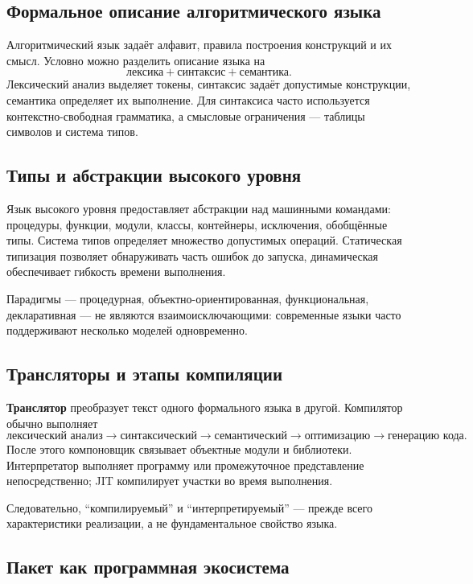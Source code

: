\subsection{Формальное описание алгоритмического языка}

Алгоритмический язык задаёт алфавит, правила построения конструкций и их смысл.
Условно можно разделить описание языка на
\[
\boxed{\text{лексика}+\text{синтаксис}+\text{семантика}}.
\]
Лексический анализ выделяет токены, синтаксис задаёт допустимые конструкции,
семантика определяет их выполнение. Для синтаксиса часто используется
контекстно-свободная грамматика, а смысловые ограничения --- таблицы символов и
система типов.

\subsection{Типы и абстракции высокого уровня}

Язык высокого уровня предоставляет абстракции над машинными командами:
процедуры, функции, модули, классы, контейнеры, исключения, обобщённые типы.
Система типов определяет множество допустимых операций. Статическая типизация
позволяет обнаруживать часть ошибок до запуска, динамическая обеспечивает
гибкость времени выполнения.

Парадигмы --- процедурная, объектно-ориентированная, функциональная,
декларативная --- не являются взаимоисключающими: современные языки часто
поддерживают несколько моделей одновременно.

\subsection{Трансляторы и этапы компиляции}

\textbf{Транслятор} преобразует текст одного формального языка в другой.
Компилятор обычно выполняет
\[
\text{лексический анализ}\to
\text{синтаксический}\to
\text{семантический}\to
\text{оптимизацию}\to
\text{генерацию кода}.
\]
После этого компоновщик связывает объектные модули и библиотеки. Интерпретатор
выполняет программу или промежуточное представление непосредственно; JIT
компилирует участки во время выполнения.

Следовательно, ``компилируемый'' и ``интерпретируемый'' --- прежде всего
характеристики реализации, а не фундаментальное свойство языка.

\subsection{Пакет как программная экосистема}

